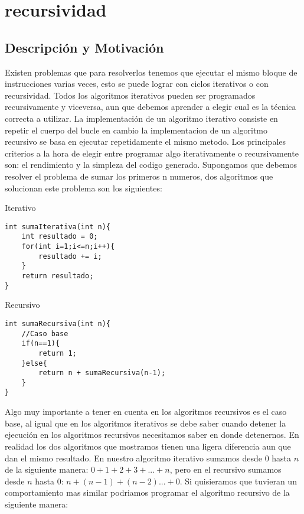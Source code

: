 \chapter{recursividad}
\section{Descripción y Motivación}

Existen problemas que para resolverlos tenemos que ejecutar el mismo bloque de instrucciones
varias veces, esto se puede lograr con ciclos iterativos o con recursividad. Todos los algoritmos
iterativos pueden ser programados recursivamente y viceversa, aun que debemos aprender a elegir
cual es la técnica correcta a utilizar. La implementación de un algoritmo iterativo consiste en repetir
el cuerpo del bucle en cambio la implementacion de un algoritmo recursivo se basa en ejecutar repetidamente el mismo metodo.
Los principales criterios a la hora de elegir entre programar algo iterativamente o recursivamente
son: el rendimiento y la simpleza del codigo generado.
Supongamos que debemos resolver el problema de sumar los primeros n numeros, dos algoritmos que
solucionan este problema son los siguientes:

\begin{minipage}{\textwidth}
Iterativo 
\begin{lstlisting}[style=C,caption=sumaIterativa.cpp]
int sumaIterativa(int n){
    int resultado = 0;
    for(int i=1;i<=n;i++){
        resultado += i;
    }
    return resultado;
}
\end{lstlisting}
\end{minipage}

	\begin{minipage}{\textwidth}
Recursivo
\begin{lstlisting}[style=C,caption=sumaRecursiva.cpp]
int sumaRecursiva(int n){
    //Caso base
    if(n==1){
        return 1;
    }else{
        return n + sumaRecursiva(n-1);
    }
}
\end{lstlisting}
\end{minipage}

Algo muy importante a tener en cuenta en los algoritmos recursivos es el caso base, al igual que
en los algoritmos iterativos se debe saber cuando detener la ejecución en los algoritmos recursivos
necesitamos saber en donde detenernos.
En realidad los dos algoritmos que mostramos tienen una ligera
diferencia aun que dan el mismo resultado. En nuestro algoritmo iterativo sumamos desde $0$ hasta $n$ de la
siguiente manera: $0+1+2+3+...+n$, pero en el recursivo sumamos desde $n$ hasta $0$: $n+(n-1)+(n-2)...+0$.
Si quisieramos que tuvieran un comportamiento mas similar podriamos programar el algoritmo recursivo
de la siguiente manera:

